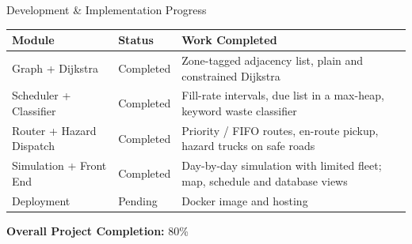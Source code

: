 \documentclass[aspectratio=169,11pt]{beamer}
\begin{document}
\begin{frame}{Development \& Implementation Progress}

\scriptsize

\begin{center}

\renewcommand{\arraystretch}{1.25}

\begin{tabularx}{.96\textwidth}
{@{}p{3cm}p{2.2cm}X@{}}

\toprule
\textbf{Module} &
\textbf{Status} &
\textbf{Work Completed}\\
\midrule

Graph + Dijkstra &
Completed &
Zone-tagged adjacency list, plain and constrained Dijkstra\\

Scheduler + Classifier &
Completed &
Fill-rate intervals, due list in a max-heap, keyword waste classifier\\

Router + Hazard Dispatch &
Completed &
Priority / FIFO routes, en-route pickup, hazard trucks on safe roads\\

Simulation + Front End &
Completed &
Day-by-day simulation with limited fleet; map, schedule and database views\\

Deployment &
Pending &
Docker image and hosting\\

\bottomrule

\end{tabularx}

\end{center}

\vspace{1mm}

\begin{center}
\colorbox{GEULightBlue}{
\parbox{.65\textwidth}{
\centering
\textbf{Overall Project Completion:}
80\%
}}
\end{center}

\end{frame}
\end{document}
